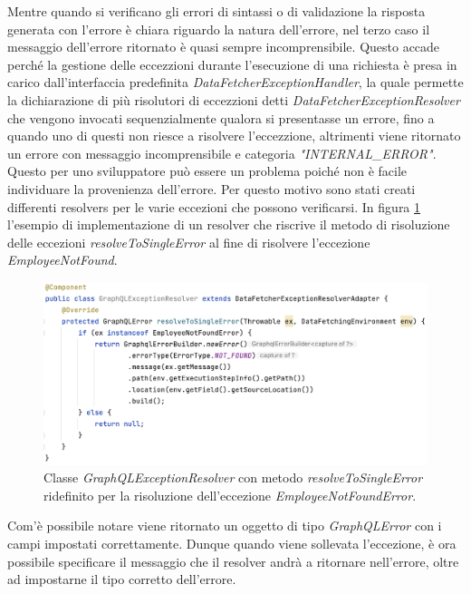 Mentre quando si verificano gli errori di sintassi o di validazione la risposta generata con l'errore è chiara riguardo la natura dell'errore, nel terzo caso il messaggio dell'errore ritornato è quasi sempre incomprensibile. Questo accade perché la gestione delle eccezzioni durante l'esecuzione di una richiesta è presa in carico dall'interfaccia predefinita \textit{DataFetcherExceptionHandler}, la quale permette la dichiarazione di più risolutori di eccezzioni detti \textit{DataFetcherExceptionResolver} che vengono invocati sequenzialmente qualora si presentasse un errore, fino a quando uno di questi non riesce a risolvere l'eccezzione, altrimenti viene ritornato un errore con messaggio incomprensibile e categoria \textit{"INTERNAL\_ERROR"}. Questo per uno sviluppatore può essere un problema poiché non è facile individuare la provenienza dell'errore. Per questo motivo sono stati creati differenti resolvers per le varie eccezioni che possono verificarsi. In figura \ref{resolver-example} l'esempio di implementazione di un resolver che riscrive il metodo di risoluzione delle eccezioni \textit{resolveToSingleError} al fine di risolvere l'eccezione \textit{EmployeeNotFound}.
\FloatBarrier
\begin{figure}[!ht]
\centering
\includegraphics[width=0.8\linewidth]{immagini/resolverExample.png}
\caption{Classe \textit{GraphQLExceptionResolver} con metodo \textit{resolveToSingleError} ridefinito per la risoluzione dell'eccezione \textit{EmployeeNotFoundError}.}
\label{resolver-example}
\end{figure}
\FloatBarrier
Com'è possibile notare viene ritornato un oggetto di tipo \textit{GraphQLError} con i campi impostati correttamente. Dunque quando viene sollevata l'eccezione, è ora possibile specificare il messaggio che il resolver andrà a ritornare nell'errore, oltre ad impostarne il tipo corretto dell'errore.
